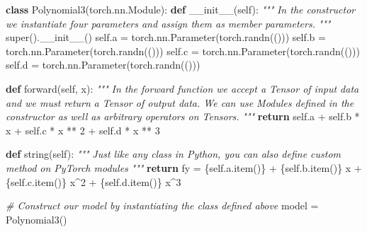\documentclass[
]{article}
\newenvironment{Shaded}{}{}
\newcommand{\BuiltInTok}[1]{\textcolor[rgb]{0.00,0.50,0.00}{#1}}
\newcommand{\CommentTok}[1]{\textcolor[rgb]{0.38,0.63,0.69}{\textit{#1}}}
\newcommand{\ControlFlowTok}[1]{\textcolor[rgb]{0.00,0.44,0.13}{\textbf{#1}}}
\newcommand{\DecValTok}[1]{\textcolor[rgb]{0.25,0.63,0.44}{#1}}
\newcommand{\FunctionTok}[1]{\textcolor[rgb]{0.02,0.16,0.49}{#1}}
\newcommand{\KeywordTok}[1]{\textcolor[rgb]{0.00,0.44,0.13}{\textbf{#1}}}
\newcommand{\NormalTok}[1]{#1}
\newcommand{\OperatorTok}[1]{\textcolor[rgb]{0.40,0.40,0.40}{#1}}
\newcommand{\SpecialCharTok}[1]{\textcolor[rgb]{0.25,0.44,0.63}{#1}}
\newcommand{\SpecialStringTok}[1]{\textcolor[rgb]{0.73,0.40,0.53}{#1}}
\newcommand{\VariableTok}[1]{\textcolor[rgb]{0.10,0.09,0.49}{#1}}
\newcommand{\1}{\boldsymbol{1}}
\begin{document}
\begin{Shaded}
\begin{Highlighting}[]
\KeywordTok{class}\NormalTok{ Polynomial3(torch.nn.Module):}
    \KeywordTok{def} \FunctionTok{\_\_init\_\_}\NormalTok{(}\VariableTok{self}\NormalTok{):}
        \CommentTok{"""}
\CommentTok{        In the constructor we instantiate four parameters and assign them as}
\CommentTok{        member parameters.}
\CommentTok{        """}
        \BuiltInTok{super}\NormalTok{().}\FunctionTok{\_\_init\_\_}\NormalTok{()}
        \VariableTok{self}\NormalTok{.a }\OperatorTok{=}\NormalTok{ torch.nn.Parameter(torch.randn(()))}
        \VariableTok{self}\NormalTok{.b }\OperatorTok{=}\NormalTok{ torch.nn.Parameter(torch.randn(()))}
        \VariableTok{self}\NormalTok{.c }\OperatorTok{=}\NormalTok{ torch.nn.Parameter(torch.randn(()))}
        \VariableTok{self}\NormalTok{.d }\OperatorTok{=}\NormalTok{ torch.nn.Parameter(torch.randn(()))}

    \KeywordTok{def}\NormalTok{ forward(}\VariableTok{self}\NormalTok{, x):}
        \CommentTok{"""}
\CommentTok{        In the forward function we accept a Tensor of input data and we must return}
\CommentTok{        a Tensor of output data. We can use Modules defined in the constructor as}
\CommentTok{        well as arbitrary operators on Tensors.}
\CommentTok{        """}
        \ControlFlowTok{return} \VariableTok{self}\NormalTok{.a }\OperatorTok{+} \VariableTok{self}\NormalTok{.b }\OperatorTok{*}\NormalTok{ x }\OperatorTok{+} \VariableTok{self}\NormalTok{.c }\OperatorTok{*}\NormalTok{ x }\OperatorTok{**} \DecValTok{2} \OperatorTok{+} \VariableTok{self}\NormalTok{.d }\OperatorTok{*}\NormalTok{ x }\OperatorTok{**} \DecValTok{3}

    \KeywordTok{def}\NormalTok{ string(}\VariableTok{self}\NormalTok{):}
        \CommentTok{"""}
\CommentTok{        Just like any class in Python, you can also define custom method on PyTorch modules}
\CommentTok{        """}
        \ControlFlowTok{return} \SpecialStringTok{f\textquotesingle{}y = }\SpecialCharTok{\{}\VariableTok{self}\SpecialCharTok{.}\NormalTok{a}\SpecialCharTok{.}\NormalTok{item()}\SpecialCharTok{\}}\SpecialStringTok{ + }\SpecialCharTok{\{}\VariableTok{self}\SpecialCharTok{.}\NormalTok{b}\SpecialCharTok{.}\NormalTok{item()}\SpecialCharTok{\}}\SpecialStringTok{ x + }\SpecialCharTok{\{}\VariableTok{self}\SpecialCharTok{.}\NormalTok{c}\SpecialCharTok{.}\NormalTok{item()}\SpecialCharTok{\}}\SpecialStringTok{ x\^{}2 + }\SpecialCharTok{\{}\VariableTok{self}\SpecialCharTok{.}\NormalTok{d}\SpecialCharTok{.}\NormalTok{item()}\SpecialCharTok{\}}\SpecialStringTok{ x\^{}3\textquotesingle{}}

\CommentTok{\# Construct our model by instantiating the class defined above}
\NormalTok{model }\OperatorTok{=}\NormalTok{ Polynomial3()}
\end{Highlighting}
\end{Shaded}
\end{document}
